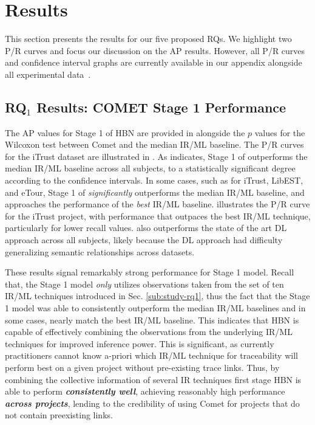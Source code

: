 \section{Results}
\label{sec:results-hbn}

This section presents the results for our five proposed RQs. We highlight two P/R curves and focus our discussion on the AP results. However, all P/R curves and confidence interval graphs are currently available in our appendix alongside all experimental data~\citep{appendix}.


\subsection{RQ$_1$ Results: C{\footnotesize OMET} Stage 1 Performance}
\label{sub:results-rq1}



The AP values for Stage 1 of \Comets HBN are provided in  alongside the $p$ values for the Wilcoxon test between Comet and the median IR/ML baseline. The P/R curves for the iTrust dataset are illustrated in . As  indicates, Stage 1 of \Comet outperforms the median IR/ML baseline across all subjects, to a statistically significant degree according to the confidence intervals. In some cases, such as for iTrust, LibEST, and eTour, Stage 1 of \Comet \textit{significantly} outperforms the median IR/ML baseline, and approaches the performance of the \textit{best} IR/ML baseline.  illustrates the P/R curve for the iTrust project, with performance that outpaces the best IR/ML technique, particularly for lower recall values. \Comet also outperforms the state of the art DL approach across all subjects, likely because the DL approach had difficulty generalizing semantic relationships across datasets.

These results signal remarkably strong performance for \Comets Stage 1 model. Recall that, the Stage 1 model \textit{only} utilizes observations taken from the set of ten IR/ML techniques introduced in Sec. \ref{sub:study-rq1}, thus the fact that the Stage 1 model was able to consistently outperform the median IR/ML baselines and in some cases, nearly match the best IR/ML baseline. This indicates that \Comets HBN is capable of effectively combining the observations from the underlying IR/ML techniques for improved inference power. This is significant, as currently practitioners cannot know a-priori which IR/ML technique for traceability will perform best on a given project without pre-existing trace links. Thus, by combining the collective information of several IR techniques \Comets first stage HBN is able to perform \textit{\textbf{consistently well}}, achieving reasonably high performance \textit{\textbf{across projects}}, lending to the credibility of using Comet for projects that do not contain preexisting links. 

